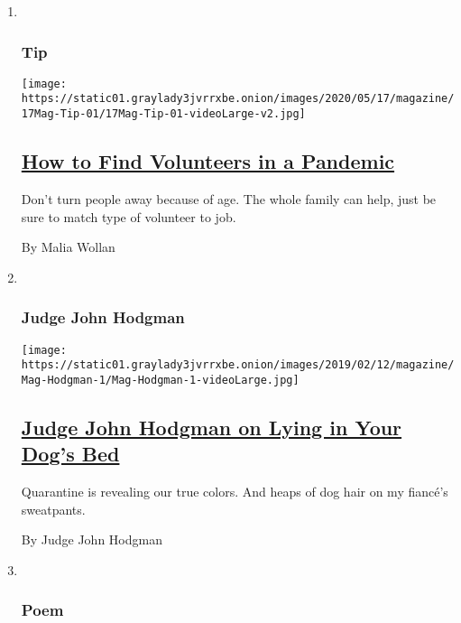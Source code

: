 \begin{enumerate}
\def\labelenumi{\arabic{enumi}.}
\item ~
  \hypertarget{tip}{%
  \subsubsection{Tip}\label{tip}}

  \texttt{[image: https://static01.graylady3jvrrxbe.onion/images/2020/05/17/magazine/17Mag-Tip-01/17Mag-Tip-01-videoLarge-v2.jpg]}

  \hypertarget{how-to-find-volunteers-in-a-pandemic}{%
  \subsection{\texorpdfstring{\href{/2020/05/12/magazine/how-to-find-volunteers-in-a-pandemic-coronavirus.html}{How
  to Find Volunteers in a
  Pandemic}}{How to Find Volunteers in a Pandemic}}\label{how-to-find-volunteers-in-a-pandemic}}

  Don't turn people away because of age. The whole family can help, just
  be sure to match type of volunteer to job.

  By Malia Wollan
\item ~
  \hypertarget{judge-john-hodgman}{%
  \subsubsection{Judge John Hodgman}\label{judge-john-hodgman}}

  \texttt{[image: https://static01.graylady3jvrrxbe.onion/images/2019/02/12/magazine/Mag-Hodgman-1/Mag-Hodgman-1-videoLarge.jpg]}

  \hypertarget{judge-john-hodgman-on-lying-in-your-dogs-bed}{%
  \subsection{\texorpdfstring{\href{/2020/05/14/magazine/judge-john-hodgman-on-lying-in-your-dogs-bed.html}{Judge
  John Hodgman on Lying in Your Dog's
  Bed}}{Judge John Hodgman on Lying in Your Dog's Bed}}\label{judge-john-hodgman-on-lying-in-your-dogs-bed}}

  Quarantine is revealing our true colors. And heaps of dog hair on my
  fiancé's sweatpants.

  By Judge John Hodgman
\item ~
  \hypertarget{poem}{%
  \subsubsection{Poem}\label{poem}}


\end{enumerate}
